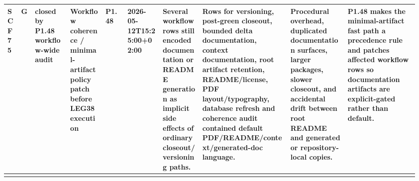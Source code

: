 \begin{longtable}{L{0.03\linewidth} L{0.026\linewidth} L{0.087\linewidth} L{0.085\linewidth} L{0.052\linewidth} L{0.085\linewidth} L{0.095\linewidth} L{0.205\linewidth} L{0.13\linewidth} L{0.165\linewidth}}
\hline
\addlinespace[0.24em]
SCF75 & G & closed by P1.48 workflow-wide audit & Workflow coherence /\allowbreak{} minimal-artifact policy patch before LEG38 execution & P1.48 & 2026-05-12T15:25:00+02:00 & Several workflow rows still encoded documentation or README generation as implicit side effects of ordinary closeout/\allowbreak{}versioning paths. & Rows for versioning, post-green closeout, bounded delta documentation, context documentation, root artifact retention, README/\allowbreak{}license, PDF layout/\allowbreak{}typography, database refresh and coherence audit contained default PDF/\allowbreak{}README/\allowbreak{}context/\allowbreak{}generated-doc language. & Procedural overhead, duplicated documentation surfaces, larger packages, slower closeout, and accidental drift between root README and generated or repository-local copies. & P1.48 makes the minimal-artifact fast path a precedence rule and patches affected workflow rows so documentation artifacts are explicit-gated rather than default.\\
\hline
\addlinespace[0.24em]
\end{longtable}
\normalsize
